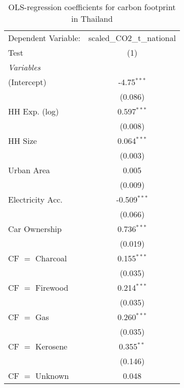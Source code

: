 
\begin{table}[htbp!]
   \centering
   \small
   \begin{adjustbox}{width = 1\textwidth, max height = 0.95\textheight, center}
      \begin{threeparttable}[b]
         \caption{\label{tab:OLS_2_THA} OLS-regression coefficients for carbon footprint in Thailand}
         \begin{tabular}{lc}
            \tabularnewline \midrule \midrule
            Dependent Variable: & scaled\_CO2\_t\_national\\     
            Test                & (1)\\  
            \midrule
            \emph{Variables}\\
            (Intercept)         & -4.75$^{***}$\\   
                                & (0.086)\\   
            HH Exp. (log)       & 0.597$^{***}$\\   
                                & (0.008)\\   
            HH Size             & 0.064$^{***}$\\   
                                & (0.003)\\   
            Urban Area          & 0.005\\   
                                & (0.009)\\   
            Electricity Acc.    & -0.509$^{***}$\\   
                                & (0.066)\\   
            Car Ownership       & 0.736$^{***}$\\   
                                & (0.019)\\   
            CF $=$ Charcoal     & 0.155$^{***}$\\   
                                & (0.035)\\   
            CF $=$ Firewood     & 0.214$^{***}$\\   
                                & (0.035)\\   
            CF $=$ Gas          & 0.260$^{***}$\\   
                                & (0.035)\\   
            CF $=$ Kerosene     & 0.355$^{**}$\\   
                                & (0.146)\\   
            CF $=$ Unknown      & 0.048\\   

\end{tabular}
\end{threeparttable}
\end{adjustbox}
\end{table}
